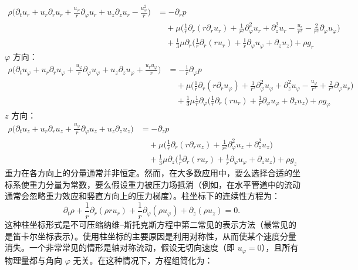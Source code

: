 $$
\begin{aligned}
\rho \big(
\partial_t u_r
+ u_r \partial_r u_r
+ \frac{u_\varphi}{r} \partial_\varphi u_r
+ u_z \partial_z u_r
- \frac{u_\varphi^2}{r}
\big)
&= -\partial_r p \\
&\quad + \mu \Big(
\frac{1}{r}\partial_r(r \partial_r u_r)
+ \frac{1}{r^2}\partial_\varphi^2 u_r
+ \partial_z^2 u_r
- \frac{u_r}{r^2}
- \frac{2}{r^2}\partial_\varphi u_\varphi
\Big) \\
&\quad + \frac{1}{3}\mu \partial_r
\Big(
\frac{1}{r}\partial_r(r u_r)
+ \frac{1}{r}\partial_\varphi u_\varphi
+ \partial_z u_z
\Big)
+ \rho g_r
\end{aligned}~
$$
$\varphi$ 方向：
$$
\begin{aligned}
\rho \big(
\partial_t u_\varphi
+ u_r \partial_r u_\varphi
+ \frac{u_\varphi}{r} \partial_\varphi u_\varphi
+ u_z \partial_z u_\varphi
+ \frac{u_r u_\varphi}{r}
\big)
&= -\frac{1}{r} \partial_\varphi p \\
&\quad + \mu \Big(
\frac{1}{r} \partial_r(r \partial_r u_\varphi)
+ \frac{1}{r^2} \partial_\varphi^2 u_\varphi
+ \partial_z^2 u_\varphi
- \frac{u_\varphi}{r^2}
+ \frac{2}{r^2} \partial_\varphi u_r
\Big) \\
&\quad + \frac{1}{3}\mu \frac{1}{r} \partial_\varphi
\Big(
\frac{1}{r}\partial_r(r u_r)
+ \frac{1}{r}\partial_\varphi u_\varphi
+ \partial_z u_z
\Big)
+ \rho g_\varphi
\end{aligned}~
$$
$z$ 方向：
$$
\begin{aligned}
\rho \big(
\partial_t u_z
+ u_r \partial_r u_z
+ \frac{u_\varphi}{r} \partial_\varphi u_z
+ u_z \partial_z u_z
\big)
&= -\partial_z p \\
&\quad + \mu \Big(
\frac{1}{r} \partial_r(r \partial_r u_z)
+ \frac{1}{r^2} \partial_\varphi^2 u_z
+ \partial_z^2 u_z
\Big) \\
&\quad + \frac{1}{3}\mu \partial_z
\Big(
\frac{1}{r}\partial_r(r u_r)
+ \frac{1}{r}\partial_\varphi u_\varphi
+ \partial_z u_z
\Big)
+ \rho g_z
\end{aligned}~
$$
重力在各方向上的分量通常并非恒定。然而，在大多数应用中，要么选择合适的坐标系使重力分量为常数，要么假设重力被压力场抵消（例如，在水平管道中的流动通常会忽略重力效应和竖直方向上的压力梯度）。柱坐标下的连续性方程为：
$$
\partial_t \rho
+ \frac{1}{r} \partial_r (\rho r u_r)
+ \frac{1}{r} \partial_\varphi (\rho u_\varphi)
+ \partial_z (\rho u_z)
= 0.~
$$
这种柱坐标形式是不可压缩纳维–斯托克斯方程中第二常见的表示方法（最常见的是笛卡尔坐标表示）。使用柱坐标的主要原因是利用对称性，从而使某个速度分量消失。一个非常常见的情形是轴对称流动，假设无切向速度（即 $u_\varphi = 0$），且所有物理量都与角向 $\varphi$ 无关。在这种情况下，方程组简化为：

